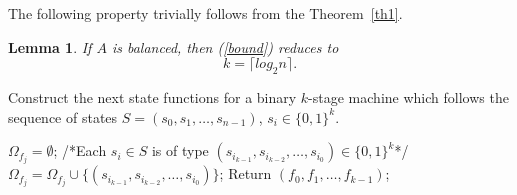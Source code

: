 \documentclass[twocolumn]{IEEEtran} \usepackage{epsfig}
\newtheorem{lemma}{Lemma}
\begin{document}
The following property trivially follows from the Theorem~\ref{th1}.

\begin{lemma} 
If $A$ is balanced, then (\ref{bound}) reduces to
\[
k=  \lceil log_2 n \rceil.
\]
\end{lemma} 

\begin{algorithm}[t!]
\caption{Construct the next state functions for a binary $k$-stage machine
which follows the sequence of states $S = (s_0, s_1, \ldots, s_{n-1})$, $s_i \in \{0,1\}^k$.}
\label{alg2}
\begin{algorithmic}[1]
\STATE $\Omega_{f_j} = \emptyset$;
\ENDFOR
{}
\STATE /*Each $s_i \in S$ is of type $(s_{i_{k-1}}, s_{i_{k-2}}, \ldots, s_{i_0})  \in \{0,1\}^k$*/
\STATE $\Omega_{f_j} = \Omega_{f_j} \cup \{(s_{i_{k-1}},s_{i_{k-2}},\ldots, s_{i_0})\}$;
\ENDIF
\ENDFOR
\ENDFOR
\STATE Return $(f_0, f_1, \ldots, f_{k-1})$;
\end{algorithmic}
\end{algorithm}
\end{document}
